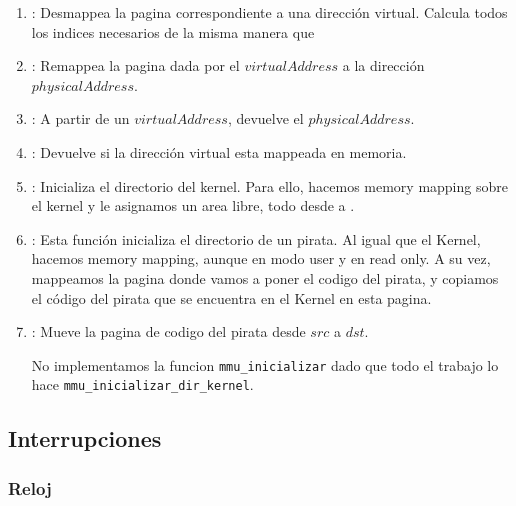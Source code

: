 \begin{enumerate}
\item {}: Desmappea la pagina correspondiente a una dirección virtual. Calcula todos los indices necesarios de la misma manera que 

\item {}: Remappea la pagina dada por el $virtualAddress$ a la dirección $physicalAddress$.

\item {}: A partir de un $virtualAddress$, devuelve el $physicalAddress$.

\item {}: Devuelve si la dirección virtual esta mappeada en memoria.

\item {}: Inicializa el directorio del kernel. Para ello, hacemos memory mapping sobre el kernel y le asignamos un area libre, todo desde  a .

\item {}: Esta función inicializa el directorio de un pirata. Al igual que el Kernel, hacemos memory mapping, aunque en modo user y en read only. A su vez, mappeamos la pagina donde vamos a poner el codigo del pirata, y copiamos el código del pirata que se encuentra en el Kernel en esta pagina.

\item {}: Mueve la pagina de codigo del pirata desde $src$ a $dst$.

No implementamos la funcion \texttt{mmu\_inicializar} dado que todo el trabajo lo hace \texttt{mmu\_inicializar\_dir\_kernel}.

\end{enumerate}

\subsection{Interrupciones}

\subsubsection{Reloj}


